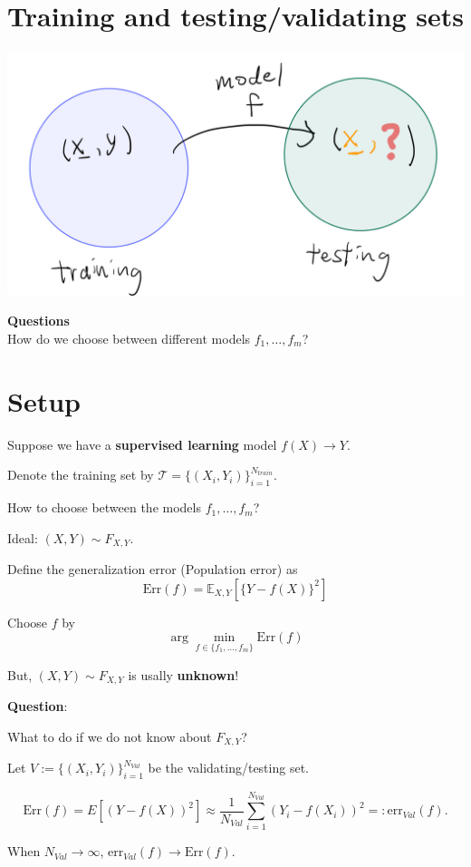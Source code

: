 \documentclass[
  letterpaper,
  DIV=11,
  numbers=noendperiod]{scrreprt}
\begin{document}
\section{Training and testing/validating
sets}\label{training-and-testingvalidating-sets}

\begin{center}
\includegraphics[width=0.6\linewidth,height=\textheight,keepaspectratio]{fig/train_test.jpeg}
\end{center}

\textbf{Questions}\\
How do we choose between different models \(f_1,\dots,f_m\)?

\section{Setup}\label{setup}

Suppose we have a \textbf{supervised learning} model \(f(X)\to Y\).

Denote the training set by
\(\mathcal{T}=\{(X_i,Y_i)\}_{i=1}^{N_{train}}\).

How to choose between the models \(f_1,\dots,f_m\)?

Ideal: \((X,Y)\sim F_{X,Y}\).

Define the generalization error (Population error) as \[
  \mathrm{Err}(f) = \mathbb{E}_{X,Y}[\{Y-f(X)\}^2] 
\]

Choose \(f\) by \[
  \arg\min_{f\in\{f_1,\dots,f_m\}} \mathrm{Err}(f)
\]

But, \((X,Y)\sim F_{X,Y}\) is usally \textbf{unknown}!

\textbf{Question}:

What to do if we do not know about \(F_{X,Y}\)?

Let \(V:=\{(X_i,Y_i)\}_{i=1}^{N_{Val}}\) be the validating/testing set.

\[
  \mathrm{Err}(f) = E[(Y-f(X))^2] \approx \frac{1}{N_{Val}}\sum_{i=1}^{N_{Val}}(Y_i-f(X_i))^2 =: \mathrm{err}_{Val}(f).
\]

When \(N_{Val}\to\infty\), \(\mathrm{err}_{Val}(f)\to \mathrm{Err}(f)\).
\end{document}
